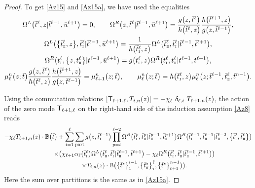 \documentclass[pdftex]{sigma}
\newcommand{\so}{\scriptscriptstyle \rm I}
\newcommand{\st}{\scriptscriptstyle \rm I\hspace{-1pt}I}
\newcommand{\bu}{\bar u}
\newcommand{\bt}{{\bar t}}
\theoremstyle{definition}
\def\BB{{\mathbb{B}}}
\def\r#1{\eqref{#1}}
\def\sT{{\sf T}}
\def\vk{\chi}
\def\Oml{\Omega^L}
\def\Omr{\Omega^R}
\begin{document}
\begin{proof}
To get \r{Az15} and \r{Az15a}, we have used the equalities
\begin{gather*}
\Oml\bigl(\bt^\ell,z|\bt^{\ell-1},\bu^{\ell+1}\bigr)=0 ,\qquad
\Omr\bigl(z,\bt^\ell |\bt^{\ell-1},\bu^{\ell+1}\bigr)=\frac{g\bigl(z,\bt^\ell\bigr)}{h\bigl(\bt^\ell,z\bigr)}
\frac{h\bigl(\bt^{\ell+1},z\bigr)}{g\bigl(z,\bt^{\ell-1}\bigr)} ,\\
\Oml\bigl(\bigl\{\bt^\ell_{\st},z\bigr\},\bt^\ell_{\so}|\bt^{\ell-1},\bu^{\ell+1}\bigr)=
\frac{1}{h\bigl(\bt^\ell_{\so},z\bigr)} \Oml\bigl(\bt^\ell_{\st},\bt^\ell_{\so}|\bt^{\ell-1},\bt^{\ell+1}\bigr) ,\\
\Omr\bigl(\bt^\ell_{\so},\bigl\{z,\bt^\ell_{\st}\bigr\}|\bt^{\ell-1},\bu^{\ell+1}\bigr)
=g\bigl(\bt^\ell_{\so},z\bigr) \Omr\bigl(\bt^\ell_{\so},\bt^\ell_{\st}|\bt^{\ell-1},\bt^{\ell+1}\bigr) ,\\
\mu^n_\ell\bigl(z;\bt\bigr) \frac{g\bigl(z,\bt^\ell\bigr)}{h\bigl(\bt^\ell,z\bigr)}
\frac{h\bigl(\bt^{\ell+1},z\bigr)}{g\bigl(z,\bt^{\ell-1}\bigr)} = \mu^n_{\ell+1}\bigl(z;\bt\bigr) ,\qquad
\mu^n_\ell\bigl(z;\bt\bigr)=h\bigl(\bt^\ell_{\so},z\bigr) \mu^n_\ell\bigl(z;\bt^{\ell-1},\bt^\ell_{\st},\bt^{n-1}\bigr) .
\end{gather*}

Using the commutation relations
$
[\sT_{\ell+1,\ell},T_{i,n}(z)]=-\vk_{\ell}\ \delta_{\ell,i}\ T_{\ell+1,n}(z)
$,
the action of the zero mode $\sT_{\ell+1,\ell}$ on the right-hand side of the induction assumption \r{Az8}
reads
\begin{gather}
-\vk_{\ell} T_{\ell+1,n}(z)\cdot\BB\bigl(\bt\bigr)+
\sum_{i=1}^{\ell}\sum_{\rm part}g\bigl(z,\bt^{\ell-1}_{\so}\bigr)\prod_{p=i}^{\ell-2}
\Omr\bigl(\bt^p_{\so},\bt^p_{\st}|\bt^{p-1}_{\st},\bt^{p+1}_{\st}\bigr)
\Omr\bigl(\bt^{\ell-1}_{\so},\bt^{\ell-1}_{\st}|\bt^{\ell-2}_{\st},\bigl\{\bt^\ell_{\so},\bt^\ell_{\st}\bigr\}\bigr)\nonumber\\
\qquad\times
\bigl(\vk_{\ell+1} \alpha_{\ell}\bigl(\bt^\ell_{\so}\bigr)
\Oml\bigl(\bt^\ell_{\st},\bt^\ell_{\so}|\bt^{\ell-1}_{\st},\bt^{\ell+1}\bigr)-
\vk_\ell
\Omr\bigl(\bt^\ell_{\so},\bt^\ell_{\st}|\bt^{\ell-1}_{\st},\bt^{\ell+1}\bigr)\bigr)\nonumber\\
\qquad\times T_{i,n}(z)
\cdot \BB\bigl(\bigl\{\bt^s\bigr\}_1^{i-1},\bigl\{\bt^s_{\st}\bigr\}_i^{\ell},\bigl\{\bt^s\bigr\}_{\ell+1}^{n-1}\bigr)\bigr) .\label{Az16}
\end{gather}
Here the sum over partitions is the same as in \r{Az15a}.


\end{proof}
\end{document}
